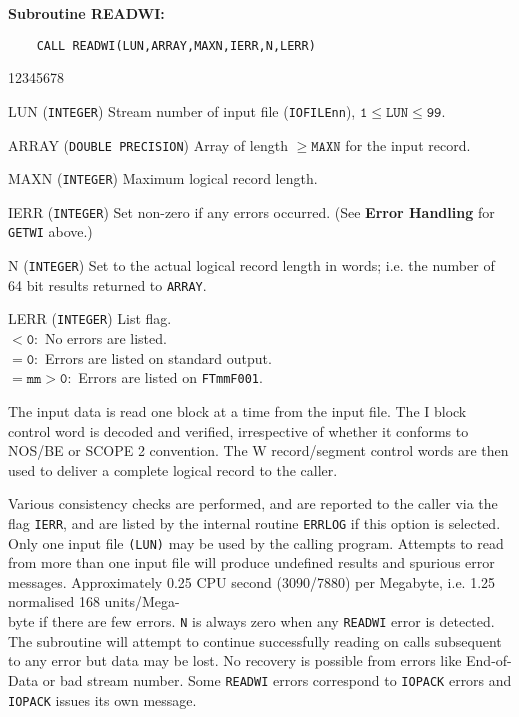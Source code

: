 {\bf Subroutine READWI:}
\begin{verbatim}
    CALL READWI(LUN,ARRAY,MAXN,IERR,N,LERR)
\end{verbatim}
\begin{DLtt}{12345678}
\item[LUN] ({\tt INTEGER}) Stream number of input file ({\tt IOFILEnn}),
$\mathtt{1 \leq LUN \leq 99}$.
\item[ARRAY] ({\tt DOUBLE PRECISION}) Array of length $\mathtt{\geq MAXN}$
for the input record.
\item[MAXN] ({\tt INTEGER}) Maximum logical record length.
\item[IERR] ({\tt INTEGER}) Set non-zero if any errors occurred.
(See {\bf Error Handling} for {\tt GETWI} above.)
\item[N] ({\tt INTEGER}) Set to the actual logical record length in
words; i.e. the number of 64 bit results returned to {\tt ARRAY}.
\item[LERR] ({\tt INTEGER}) List flag. \\
$\mathtt{< 0:}$ No errors are listed. \\
$\mathtt{= 0:}$ Errors are listed on standard output. \\
$\mathtt{= mm > 0:}$ Errors are listed on {\tt FTmmF001}.
\end{DLtt}
\Method
The input data is read one block at a time from the input file. The
I block control word is decoded and verified, irrespective of
whether it conforms to NOS/BE or SCOPE 2 convention. The W
record/segment control words are then used to deliver a complete
logical record to the caller.
\par
Various consistency checks are performed, and are reported to the caller
via the flag {\tt IERR}, and are listed by the internal routine
{\tt ERRLOG} if this option is selected.
\Restrict
Only one input file {\tt (LUN)} may be used by the calling program.
Attempts to read from more than one input file will produce undefined
results and spurious error messages.
\Timing
Approximately 0.25 CPU second (3090/7880) per Megabyte, i.e.
1.25 normalised 168 units/Mega- \\
byte if there are few errors.
\Errorh
{\tt N} is always zero when any {\tt READWI} error is detected. The
subroutine will attempt to continue successfully reading on calls
subsequent to any error but data may be lost. No recovery is
possible from errors like End-of-Data or bad stream number. Some
{\tt READWI} errors correspond to {\tt IOPACK} errors and {\tt IOPACK}
issues its own message.
\Examples
